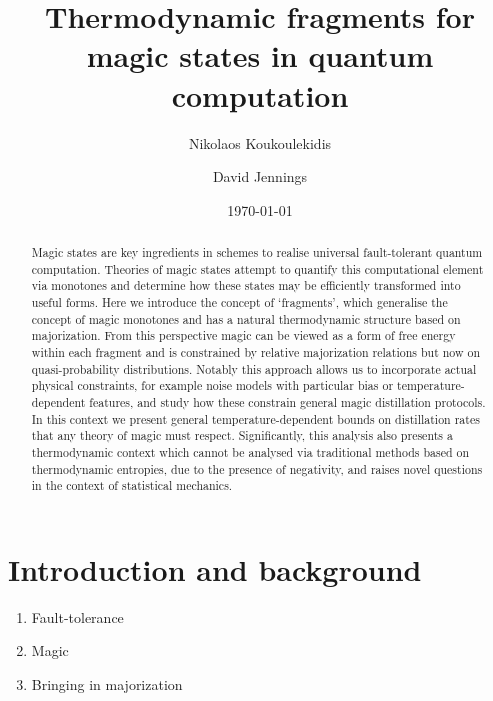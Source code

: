 \documentclass[pra,
aps,
twocolumn,
superscriptaddress,
groupedaddress,
nofootinbib,
reprint
]{revtex4-1}
\begin{document}
\begin{abstract}
\ddd{[To be sharpened]} Magic states are key ingredients in schemes to realise universal fault-tolerant quantum computation.
Theories of magic states attempt to quantify this computational element via monotones and determine how these states may be efficiently transformed into useful forms. Here we introduce the concept of `fragments', which generalise the concept of magic monotones and has a natural thermodynamic structure based on majorization. From this perspective magic can be viewed as a form of free energy within each fragment and is constrained by relative majorization relations but now on quasi-probability distributions. Notably this approach allows us to incorporate actual physical constraints, for example noise models with particular bias or temperature-dependent features, and study how these constrain general magic distillation protocols. In this context we present general temperature-dependent bounds on distillation rates that any theory of magic must respect. Significantly, this analysis also presents a thermodynamic context which cannot be analysed via traditional methods based on thermodynamic entropies, due to the presence of negativity, and raises novel questions in the context of statistical mechanics.
\end{abstract}


\title{Thermodynamic fragments for magic states in quantum computation}

\author{Nikolaos Koukoulekidis}
\author{David Jennings}

\date{\today}
\maketitle


\section{Introduction and background}
\label{sec:intro_prev}

\begin{enumerate}
    \item Fault-tolerance~\cite{cit:raussendorf, cit:gross2, cit:markov, cit:gross, cit:nest, cit:nest2, cit:vidal, cit:fujii, cit:gottesman}
    \item Magic~\cite{cit:veitch, cit:veitch2, cit:wang, cit:wang2, cit:howard, cit:campbell, cit:gross3, cit:gross4}
    \item Bringing in majorization~\cite{cit:cwiklinski, cit:lostaglio2, cit:lostaglio, cit:gour, cit:janzing, cit:brandao2, cit:gour2, cit:marshall, cit:nielsen}
\end{enumerate}
\end{document}
